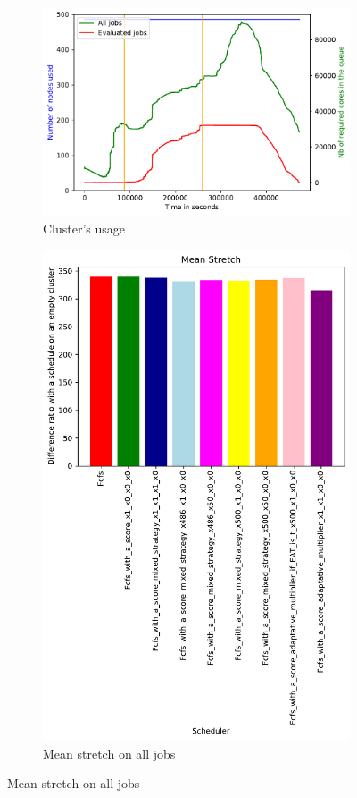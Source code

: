 \documentclass[a4paper]{article}
\begin{document}
\begin{figure}[H]\centering
\begin{subfigure}[b]{0.4\linewidth}\centering\includegraphics[width=1\linewidth]{MBSS/plot/2022-05-21->2022-05-22_V9271_Fcfs_Used_nodes_450_128_32_256_4_1024.pdf}\caption{Cluster's usage}\end{subfigure}
\begin{subfigure}[b]{0.4\linewidth}\centering\includegraphics[width=0.9\linewidth]{MBSS/plot/Results_FCFS_Score_Adaptative_Multiplier_2022-05-21->2022-05-22_V9271_Mean_Stretch_450_128_32_256_4_1024.pdf}\caption{Mean stretch on all jobs}\end{subfigure}

\end{figure}
\end{document}
